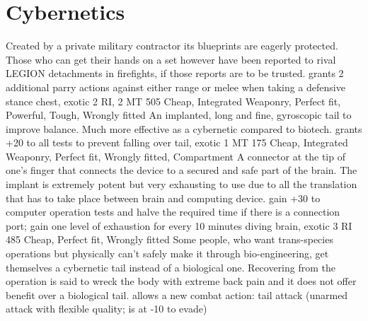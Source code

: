 \documentclass[12pt,a4paper,openany,usenames,dvipsnames]{book}
\begin{document}
    \section{Cybernetics}
    \vspace{5mm}
    \begin{multicols}{2}
        {Created by a private military contractor its blueprints are eagerly protected. Those who can get their hands on a set however have been reported to rival LEGION detachments in firefights, if those reports are to be trusted.}
        {grants 2 additional parry actions against either range or melee when taking a defensive stance}
        {chest, exotic}
        {2 RI, 2 MT}
        {505}
        {Cheap, Integrated Weaponry, Perfect fit, Powerful, Tough, Wrongly fitted}
        {An implanted, long and fine, gyroscopic tail to improve balance. Much more effective as a cybernetic compared to biotech.}
        {grants +20 to all tests to prevent falling over}
        {tail, exotic}
        {1 MT}
        {175}
        {Cheap, Integrated Weaponry, Perfect fit, Wrongly fitted, Compartment}
        {A connector at the tip of one's finger that connects the device to a secured and safe part of the brain. The implant is extremely potent but very exhausting to use due to all the translation that has to take place between brain and computing device.}
        {gain +30 to computer operation tests and halve the required time if there is a connection port; gain one level of exhaustion for every 10 minutes diving}
        {brain, exotic}
        {3 RI}
        {485}
        {Cheap, Perfect fit, Wrongly fitted}
        {Some people, who want trans-species operations but physically can't safely make it through bio-engineering, get themselves a cybernetic tail instead of a biological one. Recovering from the operation is said to wreck the body with extreme back pain and it does not offer benefit over a biological tail.}
        {allows a new combat action: tail attack (unarmed attack with flexible quality; is at -10 to evade)}

\end{multicols}
\end{document}
